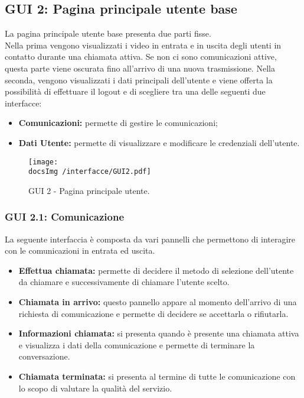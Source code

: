 \subsection{GUI 2: Pagina principale utente base}
La pagina principale utente base presenta due parti fisse.\\
Nella prima vengono visualizzati i video in entrata e in uscita degli utenti in contatto durante una chiamata attiva. Se non ci sono comunicazioni attive, questa parte viene oscurata fino all'arrivo di una nuova trasmissione. Nella seconda, vengono visualizzati i dati principali dell'utente e viene offerta la possibilità di effettuare il logout e di scegliere tra una delle seguenti due interfacce:
\begin{itemize}
\item \textbf{Comunicazioni:} permette di gestire le comunicazioni;
\item \textbf{Dati Utente:} permette di visualizzare e modificare le credenziali dell’utente.
\end{itemize} 
\begin{figure}[h!tbp]
\centering
\texttt{[image: \\docsImg /interfacce/GUI2.pdf]}
\caption{GUI 2 - Pagina principale utente.}
\end{figure}

\subsubsection{GUI 2.1: Comunicazione}
La seguente interfaccia è composta da vari pannelli che permettono di interagire con le comunicazioni in entrata ed uscita.
\begin{itemize}
\item \textbf{Effettua chiamata:} permette di decidere il metodo di selezione dell’utente da chiamare e successivamente di chiamare l’utente scelto.
\item \textbf{Chiamata in arrivo:} questo pannello appare al momento dell’arrivo di una richiesta di comunicazione e permette di decidere se accettarla o rifiutarla.
\item \textbf{Informazioni chiamata:} si presenta quando è presente una chiamata attiva e visualizza i dati della comunicazione e permette di terminare la conversazione.
\item \textbf{Chiamata terminata:} si presenta al termine di tutte le comunicazione con lo scopo di valutare la qualità del servizio.
\end{itemize} 

